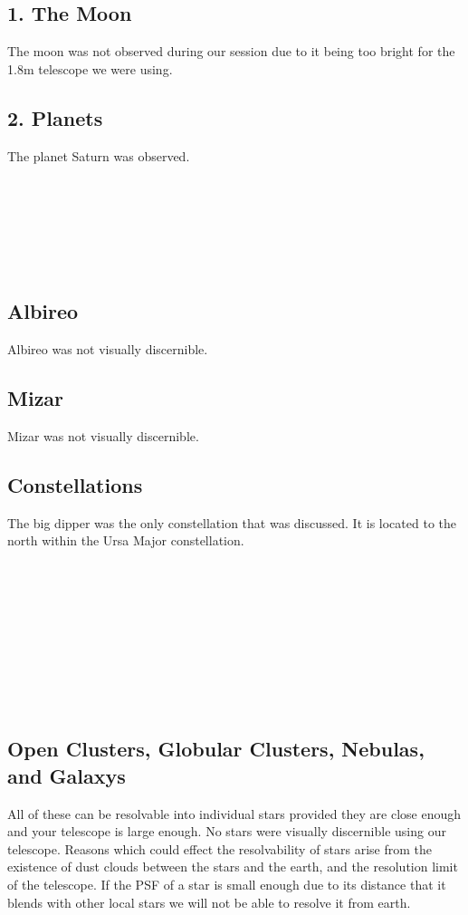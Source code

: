 \documentclass{article}
\begin{document}
\subsection{1. The Moon}
The moon was not observed during our session due to it being too bright for the 1.8m telescope we were using.
\subsection{2. Planets}
The planet Saturn was observed.\\
\\
\\
\\
\\
\\
\\

\subsection{Albireo}
Albireo was not visually discernible.
\subsection{Mizar}
Mizar was not visually discernible.
\subsection{Constellations}
The big dipper was the only constellation that was discussed. It is located to the north within the Ursa Major constellation.\\
\\
\\
\\
\\
\\
\\
\\
\\
\\

\subsection{Open Clusters, Globular Clusters, Nebulas, and Galaxys}
All of these can be resolvable into individual stars provided they are close enough and your telescope is large enough. No stars were visually discernible using our telescope. Reasons which could effect the resolvability of stars arise from the existence of dust clouds between the stars and the earth, and the resolution limit of the telescope. If the PSF of a star is small enough due to its distance that it blends with other local stars we will not be able to resolve it from earth.
\end{document}
